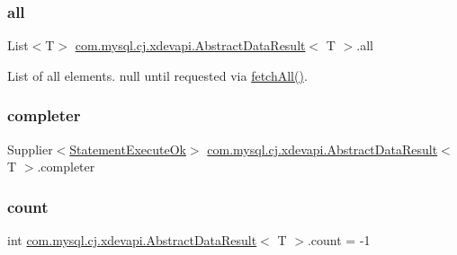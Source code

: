 \subsubsection{\texorpdfstring{all}{all}}
{\footnotesize\ttfamily List$<$T$>$ \mbox{\hyperlink{classcom_1_1mysql_1_1cj_1_1xdevapi_1_1_abstract_data_result}{com.\+mysql.\+cj.\+xdevapi.\+Abstract\+Data\+Result}}$<$ T $>$.all\hspace{0.3cm}{\ttfamily [protected]}}

List of all elements. {\ttfamily null} until requested via \mbox{\hyperlink{classcom_1_1mysql_1_1cj_1_1xdevapi_1_1_abstract_data_result_aa0376cefb0ca352d431b392149481588}{fetch\+All()}}. \mbox{\label{classcom_1_1mysql_1_1cj_1_1xdevapi_1_1_abstract_data_result_aec36caa2d5404a5748add97ebab8bc1e}} 
\subsubsection{\texorpdfstring{completer}{completer}}
{\footnotesize\ttfamily Supplier$<$\mbox{\hyperlink{classcom_1_1mysql_1_1cj_1_1protocol_1_1x_1_1_statement_execute_ok}{Statement\+Execute\+Ok}}$>$ \mbox{\hyperlink{classcom_1_1mysql_1_1cj_1_1xdevapi_1_1_abstract_data_result}{com.\+mysql.\+cj.\+xdevapi.\+Abstract\+Data\+Result}}$<$ T $>$.completer\hspace{0.3cm}{\ttfamily [protected]}}

\mbox{\label{classcom_1_1mysql_1_1cj_1_1xdevapi_1_1_abstract_data_result_ac8f7cdced67df259befd51e1e7d9a2b7}} 
\subsubsection{\texorpdfstring{count}{count}}
{\footnotesize\ttfamily int \mbox{\hyperlink{classcom_1_1mysql_1_1cj_1_1xdevapi_1_1_abstract_data_result}{com.\+mysql.\+cj.\+xdevapi.\+Abstract\+Data\+Result}}$<$ T $>$.count = -\/1\hspace{0.3cm}{\ttfamily [protected]}}


